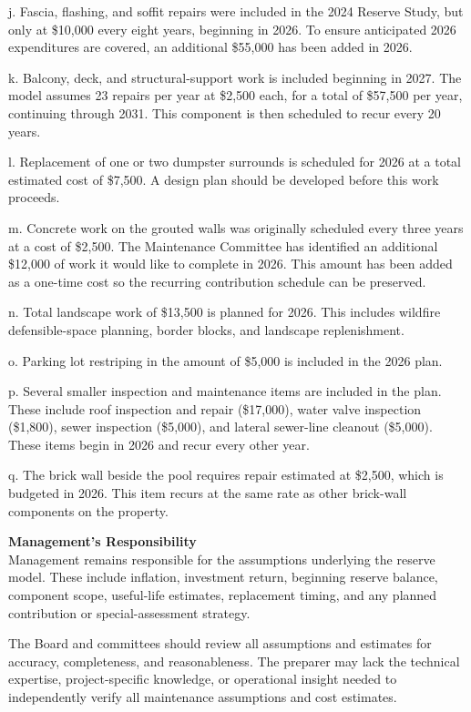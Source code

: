 \documentclass[11pt,letterpaper]{article}
\begin{document}
j. Fascia, flashing, and soffit repairs were included in the 2024 Reserve Study, but only at \$10,000 every eight years, beginning in 2026. To ensure anticipated 2026 expenditures are covered, an additional \$55,000 has been added in 2026.

k. Balcony, deck, and structural-support work is included beginning in 2027. The model assumes 23 repairs per year at \$2,500 each, for a total of \$57,500 per year, continuing through 2031. This component is then scheduled to recur every 20 years.

l. Replacement of one or two dumpster surrounds is scheduled for 2026 at a total estimated cost of \$7,500. A design plan should be developed before this work proceeds.

m. Concrete work on the grouted walls was originally scheduled every three years at a cost of \$2,500. The Maintenance Committee has identified an additional \$12,000 of work it would like to complete in 2026. This amount has been added as a one-time cost so the recurring contribution schedule can be preserved.

n. Total landscape work of \$13,500 is planned for 2026. This includes wildfire defensible-space planning, border blocks, and landscape replenishment.

o. Parking lot restriping in the amount of \$5,000 is included in the 2026 plan.

p. Several smaller inspection and maintenance items are included in the plan. These include roof inspection and repair (\$17,000), water valve inspection (\$1,800), sewer inspection (\$5,000), and lateral sewer-line cleanout (\$5,000). These items begin in 2026 and recur every other year.

q. The brick wall beside the pool requires repair estimated at \$2,500, which is budgeted in 2026. This item recurs at the same rate as other brick-wall components on the property.

{\bfseries Management’s Responsibility}\\
Management remains responsible for the assumptions underlying the reserve model. These include inflation, investment return, beginning reserve balance, component scope, useful-life estimates, replacement timing, and any planned contribution or special-assessment strategy.

The Board and committees should review all assumptions and estimates for accuracy, completeness, and reasonableness. The preparer may lack the technical expertise, project-specific knowledge, or operational insight needed to independently verify all maintenance assumptions and cost estimates.
\end{document}
